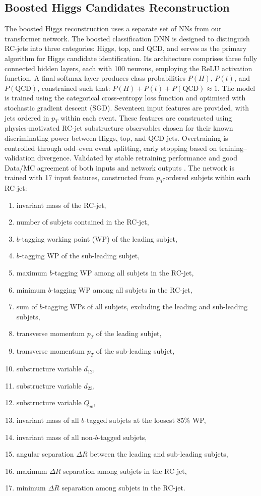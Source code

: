 \subsection{Boosted Higgs Candidates Reconstruction}
The boosted Higgs reconstruction uses a separate set of NNs from our transformer network. The boosted classification DNN is designed to distinguish RC-jets into three categories: Higgs, top, and QCD, and serves as the primary algorithm for Higgs candidate identification. Its architecture comprises three fully connected hidden layers, each with 100 neurons, employing the ReLU activation function. A final softmax layer produces class probabilities $P(H)$, $P(t)$, and $P(\text{QCD})$, constrained such that: $P(H) + P(t) + P(\text{QCD}) \approx 1.$  The model is trained using the categorical cross-entropy loss function and optimised with stochastic gradient descent (SGD). Seventeen input features are provided, with jets ordered in $p_{T}$ within each event. These features are constructed using physics-motivated RC-jet substructure observables chosen for their known discriminating power between Higgs, top, and QCD jets. Overtraining is controlled through odd–even event splitting, early stopping based on training–validation divergence. Validated by stable retraining performance and good Data/MC agreement of both inputs and network outputs \cite{bruno_thesis}. The network is trained with 17 input features, constructed from $p_{T}$-ordered subjets within each RC-jet:  
\begin{enumerate}
  \item invariant mass of the RC-jet,  
  \item number of subjets contained in the RC-jet,  
  \item $b$-tagging working point (WP) of the leading subjet,  
  \item $b$-tagging WP of the sub-leading subjet,  
  \item maximum $b$-tagging WP among all subjets in the RC-jet,  
  \item minimum $b$-tagging WP among all subjets in the RC-jet,  
  \item sum of $b$-tagging WPs of all subjets, excluding the leading and sub-leading subjets,  
  \item transverse momentum $p_{T}$ of the leading subjet,  
  \item transverse momentum $p_{T}$ of the sub-leading subjet,  
  \item substructure variable $d_{12}$,  
  \item substructure variable $d_{23}$,  
  \item substructure variable $Q_{w}$,  
  \item invariant mass of all $b$-tagged subjets at the loosest 85\% WP,  
  \item invariant mass of all non-$b$-tagged subjets,  
  \item angular separation $\Delta R$ between the leading and sub-leading subjets,  
  \item maximum $\Delta R$ separation among subjets in the RC-jet,  
  \item minimum $\Delta R$ separation among subjets in the RC-jet.  
\end{enumerate}
